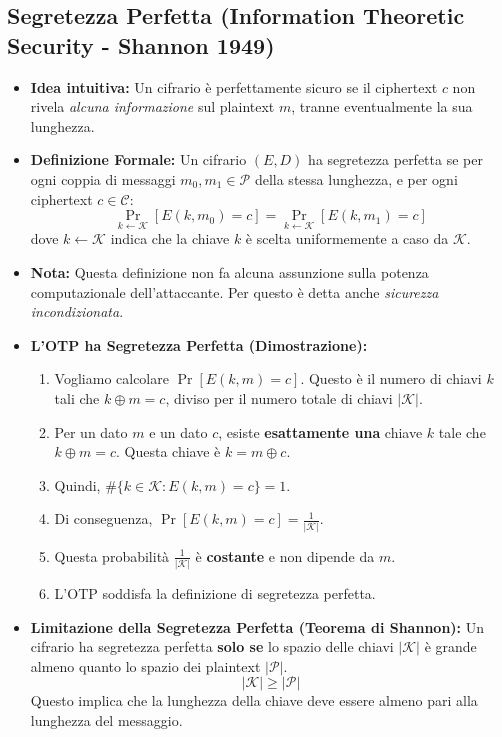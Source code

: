 \subsection{Segretezza Perfetta (Information Theoretic Security - Shannon 1949)}
\begin{itemize}
    \item \textbf{Idea intuitiva:} Un cifrario è perfettamente sicuro se il ciphertext $c$ non rivela \textit{alcuna informazione} sul plaintext $m$, tranne eventualmente la sua lunghezza.
    \item \textbf{Definizione Formale:} Un cifrario $(E, D)$ ha segretezza perfetta se per ogni coppia di messaggi $m_0, m_1 \in \mathcal{P}$ della stessa lunghezza, e per ogni ciphertext $c \in \mathcal{C}$:
    \[ \Pr_{k \leftarrow \mathcal{K}}[E(k, m_0) = c] = \Pr_{k \leftarrow \mathcal{K}}[E(k, m_1) = c] \]
    dove $k \leftarrow \mathcal{K}$ indica che la chiave $k$ è scelta uniformemente a caso da $\mathcal{K}$.
    \item \textbf{Nota:} Questa definizione non fa alcuna assunzione sulla potenza computazionale dell'attaccante. Per questo è detta anche \textit{sicurezza incondizionata}.
    \item \textbf{L'OTP ha Segretezza Perfetta (Dimostrazione):}
    \begin{enumerate}
        \item Vogliamo calcolare $\Pr[E(k, m) = c]$. Questo è il numero di chiavi $k$ tali che $k \oplus m = c$, diviso per il numero totale di chiavi $|\mathcal{K}|$.
        \item Per un dato $m$ e un dato $c$, esiste \textbf{esattamente una} chiave $k$ tale che $k \oplus m = c$. Questa chiave è $k = m \oplus c$.
        \item Quindi, $\#\{k \in \mathcal{K} : E(k,m) = c\} = 1$.
        \item Di conseguenza, $\Pr[E(k, m) = c] = \frac{1}{|\mathcal{K}|}$.
        \item Questa probabilità $\frac{1}{|\mathcal{K}|}$ è \textbf{costante} e non dipende da $m$.
        \item L'OTP soddisfa la definizione di segretezza perfetta.
    \end{enumerate}
    \item \textbf{Limitazione della Segretezza Perfetta (Teorema di Shannon):}
    Un cifrario ha segretezza perfetta \textbf{solo se} lo spazio delle chiavi $|\mathcal{K}|$ è grande almeno quanto lo spazio dei plaintext $|\mathcal{P}|$.
    \[ |\mathcal{K}| \geq |\mathcal{P}| \]
    Questo implica che la lunghezza della chiave deve essere almeno pari alla lunghezza del messaggio.
\end{itemize}

